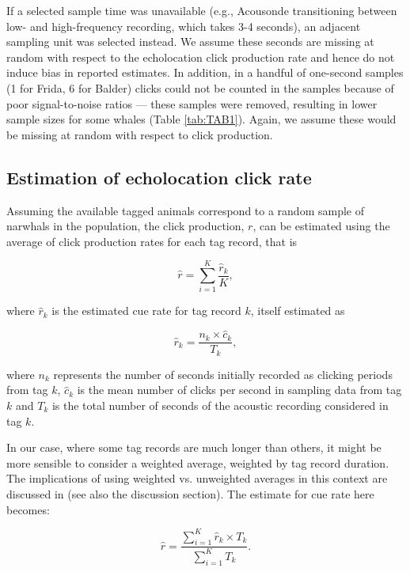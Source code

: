 \documentclass[preprint]{JASA}
\begin{document}
If a selected sample time was unavailable (e.g., Acousonde transitioning between low- and high-frequency recording, which takes 3-4 seconds), an adjacent sampling unit was selected instead.  We assume these seconds are missing at random with respect to the echolocation click production rate and hence do not induce bias in reported estimates. In addition, in a handful of one-second samples (1 for Frida, 6 for Balder) clicks could not be counted in the samples because of poor signal-to-noise ratios — these samples were removed, resulting in lower sample sizes for some whales (Table \ref{tab:TAB1}). Again, we assume these would be missing at random with respect to click production.

\subsection{\label{sec:2:7} Estimation of echolocation click rate}

Assuming the available tagged animals correspond to a random sample of narwhals in the population, the click production, $r$, can be estimated using the average of click production rates for each tag record, that is 

$$ \hat r = \sum_{i=1}^K \frac{ \hat r_k} {K},$$

\noindent where $\hat r_k$ is the estimated cue rate for tag record $k$, itself estimated as 

$$ \hat r_k = \frac{n_k\times \hat c_k}{T_k},$$

\noindent where $n_k$ represents the number of seconds initially recorded as clicking periods from tag $k$, $\hat c_k$ is the mean number of clicks per second in sampling data from tag $k$ and $T_k$ is the total number of seconds of the acoustic recording considered in tag $k$.

In our case, where some tag records are much longer than others, it might be more sensible to consider a weighted average, weighted by tag record duration. The implications of using weighted vs. unweighted averages in this context are discussed in \citet{Marques20233} (see also the discussion section). The estimate for cue rate here becomes:

$$ \hat r =  \frac{\sum_{i=1}^K \hat r_k \times T_k} {\sum_{i=1}^K T_k}. $$ 

\end{document}
